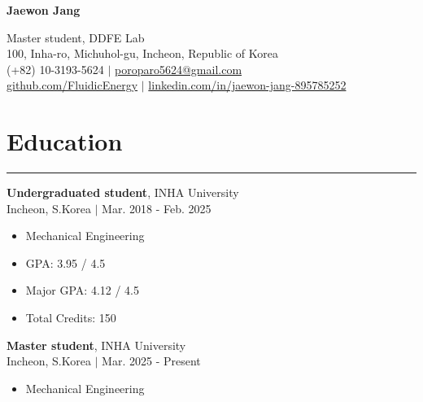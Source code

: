 \documentclass{article} %
\newcommand{\mycventry}[5]{
  \vspace{1.5em} %

  \textbf{#1}, #2 \\ %
  #3 $|$ #4 \\[0.4em] %

  \begin{itemize}[nosep, after=\vspace{-0.4em}] %
    #5 %
  \end{itemize}
}
\newcommand{\sectionsplitrule}{
  \hrule %
  \vspace{1em} %
}
\begin{document}
\begin{center}
    {\Huge \textbf{Jaewon Jang}} %

    \vspace{0.5em} %

    Master student, DDFE Lab \\ %
    100, Inha-ro, Michuhol-gu, Incheon, Republic of Korea \\ %
    (+82) 10-3193-5624 $|$ \href{mailto:poroparo5624@gmail.com}{poroparo5624@gmail.com} \\ %
    \href{https://github.com/FluidicEnergy}{github.com/FluidicEnergy} $|$ \href{https://www.linkedin.com/in/jaewon-jang-895785252}{linkedin.com/in/jaewon-jang-895785252} %
\end{center}




\section*{Education}
\sectionsplitrule

\mycventry
  {Undergraduated student} %
  {INHA University} %
  {Incheon, S.Korea} %
  {Mar. 2018 - Feb. 2025} %
  { %
    \item Mechanical Engineering 
    \item GPA: 3.95 / 4.5
    \item Major GPA: 4.12 / 4.5
    \item Total Credits: 150 
  }

\mycventry
  {Master student}
  {INHA University} %
  {Incheon, S.Korea} %
  {Mar. 2025 - Present} %
  {
    \item Mechanical Engineering 
  }


\end{document}

